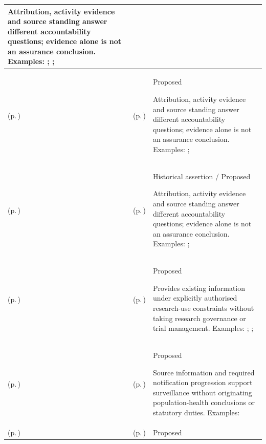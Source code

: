 \begin{longtable}{|>{\raggedright\arraybackslash}p{0.27\TableWidth}|>{\raggedright\arraybackslash}p{0.27\TableWidth}|>{\raggedright\arraybackslash}p{0.46\TableWidth}|}
Attribution, activity evidence and source standing answer different accountability questions; evidence alone is not an assurance conclusion. Examples: \nameref{feature:mandatory-significant-activity-audit-capture}; \nameref{function:capture-required-significant-audit-evidence}; \nameref{service:mandatory-audit-evidence-capture}\\\hline
\nameref{cap:bc-digital-accountability-trust} (p.\,\pageref{cap:bc-digital-accountability-trust}) & \nameref{cap:bec-information-lineage-stewardship} (p.\,\pageref{cap:bec-information-lineage-stewardship}) & Proposed

Attribution, activity evidence and source standing answer different accountability questions; evidence alone is not an assurance conclusion. Examples: \nameref{feature:information-transformation-lineage}; \nameref{function:record-significant-information-lineage}\\\hline
\nameref{cap:bc-digital-accountability-trust} (p.\,\pageref{cap:bc-digital-accountability-trust}) & \nameref{cap:bec-information-authority-representation} (p.\,\pageref{cap:bec-information-authority-representation}) & Historical assertion / Proposed

Attribution, activity evidence and source standing answer different accountability questions; evidence alone is not an assurance conclusion. Examples: \nameref{feature:information-authority-source-standing-representation}; \nameref{function:qualify-information-authority-standing}\\\hline
\nameref{cap:bc-research-information-support} (p.\,\pageref{cap:bc-research-information-support}) & \nameref{cap:bec-authorised-research-information-provision} (p.\,\pageref{cap:bec-authorised-research-information-provision}) & Proposed

Provides existing information under explicitly authorised research-use constraints without taking research governance or trial management. Examples: \nameref{feature:authorised-research-release-assembly}; \nameref{function:assemble-purpose-qualified-research-release}; \nameref{service:authorised-research-information-export}\\\hline
\nameref{cap:bc-population-health-surveillance} (p.\,\pageref{cap:bc-population-health-surveillance}) & \nameref{cap:bec-population-health-notification-enablement} (p.\,\pageref{cap:bec-population-health-notification-enablement}) & Proposed

Source information and required notification progression support surveillance without originating population-health conclusions or statutory duties. Examples: \nameref{feature:population-notification-obligation-tracking}\\\hline
\nameref{cap:bc-population-health-surveillance} (p.\,\pageref{cap:bc-population-health-surveillance}) & \nameref{cap:bec-health-information-access} (p.\,\pageref{cap:bec-health-information-access}) & Proposed


\end{longtable}
